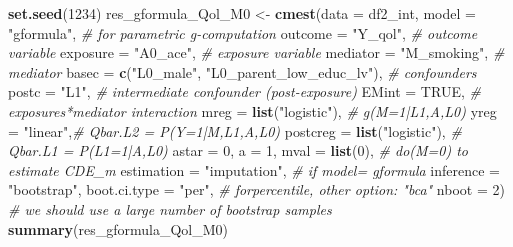 \documentclass[
]{book}
\newenvironment{Shaded}{\begin{snugshade}}{\end{snugshade}}
\newcommand{\AttributeTok}[1]{\textcolor[rgb]{0.13,0.29,0.53}{#1}}
\newcommand{\CommentTok}[1]{\textcolor[rgb]{0.56,0.35,0.01}{\textit{#1}}}
\newcommand{\ConstantTok}[1]{\textcolor[rgb]{0.56,0.35,0.01}{#1}}
\newcommand{\DecValTok}[1]{\textcolor[rgb]{0.00,0.00,0.81}{#1}}
\newcommand{\FunctionTok}[1]{\textcolor[rgb]{0.13,0.29,0.53}{\textbf{#1}}}
\newcommand{\NormalTok}[1]{#1}
\newcommand{\OtherTok}[1]{\textcolor[rgb]{0.56,0.35,0.01}{#1}}
\newcommand{\StringTok}[1]{\textcolor[rgb]{0.31,0.60,0.02}{#1}}
\begin{document}
\begin{Shaded}
\begin{Highlighting}[]
\FunctionTok{set.seed}\NormalTok{(}\DecValTok{1234}\NormalTok{)}
\NormalTok{res\_gformula\_Qol\_M0 }\OtherTok{\textless{}{-}} \FunctionTok{cmest}\NormalTok{(}\AttributeTok{data =}\NormalTok{ df2\_int, }
                         \AttributeTok{model =} \StringTok{"gformula"}\NormalTok{, }\CommentTok{\# for parametric g{-}computation}
                         \AttributeTok{outcome =} \StringTok{"Y\_qol"}\NormalTok{, }\CommentTok{\# outcome variable}
                         \AttributeTok{exposure =} \StringTok{"A0\_ace"}\NormalTok{, }\CommentTok{\# exposure variable}
                         \AttributeTok{mediator =} \StringTok{"M\_smoking"}\NormalTok{, }\CommentTok{\# mediator}
                         \AttributeTok{basec =} \FunctionTok{c}\NormalTok{(}\StringTok{"L0\_male"}\NormalTok{,}
                                   \StringTok{"L0\_parent\_low\_educ\_lv"}\NormalTok{), }\CommentTok{\# confounders}
                         \AttributeTok{postc =} \StringTok{"L1"}\NormalTok{, }\CommentTok{\# intermediate confounder (post{-}exposure)}
                         \AttributeTok{EMint =} \ConstantTok{TRUE}\NormalTok{, }\CommentTok{\# exposures*mediator interaction}
                         \AttributeTok{mreg =} \FunctionTok{list}\NormalTok{(}\StringTok{"logistic"}\NormalTok{), }\CommentTok{\# g(M=1|L1,A,L0)}
                         \AttributeTok{yreg =} \StringTok{"linear"}\NormalTok{,}\CommentTok{\# Qbar.L2 = P(Y=1|M,L1,A,L0)}
                         \AttributeTok{postcreg =} \FunctionTok{list}\NormalTok{(}\StringTok{"logistic"}\NormalTok{), }\CommentTok{\# Qbar.L1 = P(L1=1|A,L0)}
                         \AttributeTok{astar =} \DecValTok{0}\NormalTok{,}
                         \AttributeTok{a =} \DecValTok{1}\NormalTok{,}
                         \AttributeTok{mval =} \FunctionTok{list}\NormalTok{(}\DecValTok{0}\NormalTok{), }\CommentTok{\# do(M=0) to estimate CDE\_m}
                         \AttributeTok{estimation =} \StringTok{"imputation"}\NormalTok{, }\CommentTok{\# if model= gformula}
                         \AttributeTok{inference =} \StringTok{"bootstrap"}\NormalTok{,}
                         \AttributeTok{boot.ci.type =} \StringTok{"per"}\NormalTok{, }\CommentTok{\# forpercentile, other option: "bca"}
                         \AttributeTok{nboot =} \DecValTok{2}\NormalTok{) }\CommentTok{\# we should use a large number of bootstrap samples}
\FunctionTok{summary}\NormalTok{(res\_gformula\_Qol\_M0)}


\end{Highlighting}
\end{Shaded}
\end{document}
